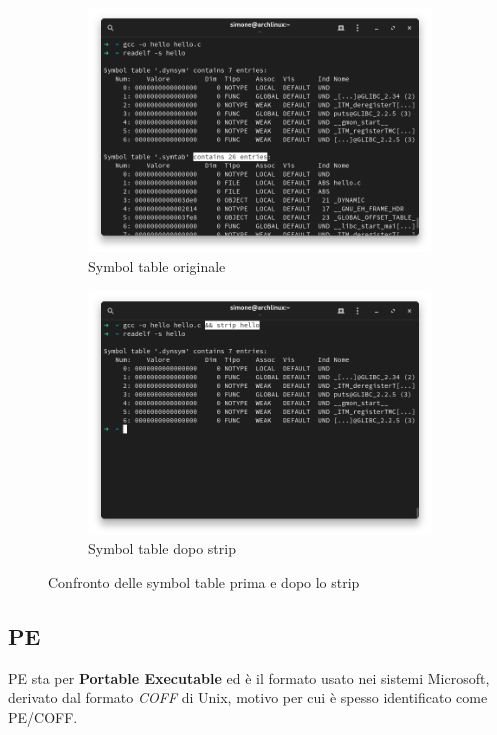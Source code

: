 \begin{figure}[!htb]
    \centering
    \begin{subfigure}[t]{0.48\textwidth}
        \centering
        \includegraphics[width=\textwidth]{assets/elf_symtab_full.png}
        \caption{Symbol table originale}
    \end{subfigure}
    \begin{subfigure}[t]{0.48\textwidth}
        \centering
        \includegraphics[width=\textwidth]{assets/elf_symtab_stripped.png}
        \caption{Symbol table dopo strip}
    \end{subfigure}
    \caption{Confronto delle symbol table prima e dopo lo strip}
    \label{fig:elf_symtab}
\end{figure}


\subsection{PE}
PE sta per \textbf{Portable Executable} ed è il formato usato nei sistemi Microsoft, derivato dal formato \emph{COFF} di Unix, motivo per cui è spesso identificato come PE/COFF. \cite{forensic_friday_execs}

